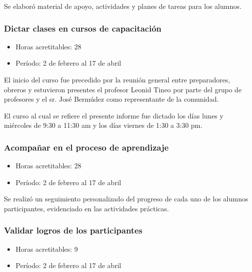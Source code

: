                 Se elaboró material de apoyo, actividades y planes de tareas para los alumnos.
                
             \subsubsection {Dictar clases en cursos de capacitación}
             \begin{itemize}
                 \item Horas acretitables: 28
                 \item Período: 2 de febrero al 17 de abril
                \end{itemize}
                
                El inicio del curso fue precedido por la reunión general entre preparadores, obreros y estuvieron presentes el profesor Leonid Tineo por parte del grupo de profesores y el sr. José Bermúdez como representante de la comunidad.
                
                El curso al cual se refiere el presente informe fue dictado los días lunes y miércoles de 9:30 a 11:30 am y los días viernes de 1:30 a 3:30 pm.
                
             \subsubsection {Acompañar en el proceso de aprendizaje}
             \begin{itemize}
                 \item Horas acretitables: 28
                 \item Período: 2 de febrero al 17 de abril
                \end{itemize}
                
                Se realizó un seguimiento personalizado del progreso de cada uno de los alumnos participantes, evidenciado en las actividades prácticas.
                
             \subsubsection {Validar logros de los participantes}
             \begin{itemize}
                 \item Horas acretitables: 9
                 \item Período: 2 de febrero al 17 de abril
                \end{itemize}
                
